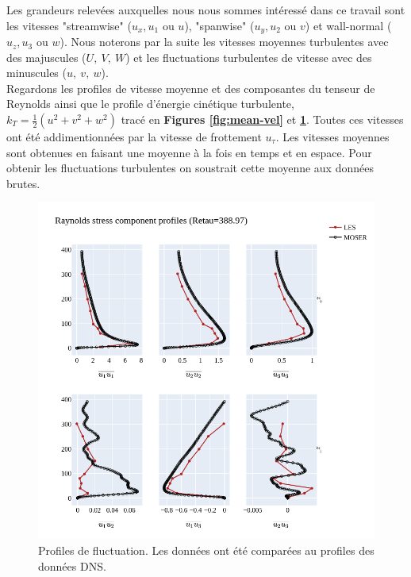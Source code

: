 \documentclass[12pt]{article}
\theoremstyle{plain}
\theoremstyle{remark}
\begin{document}
Les grandeurs relevées auxquelles nous nous sommes intéressé dans ce travail sont les vitesses "streamwise" ($u_x, u_1 \text{ ou } u$), "spanwise" ($u_y, u_2 \text{ ou } v$) et wall-normal ($u_z, u_3 \text{ ou } w$). Nous noterons par la suite les vitesses moyennes turbulentes avec des majuscules ($U,~V,~W$) et les fluctuations turbulentes de vitesse avec des minuscules ($u,~v,~w$).\\

Regardons les profiles de vitesse moyenne et des composantes du tenseur de Reynolds ainsi que le profile d'énergie cinétique turbulente, $k_T=\frac{1}{2}(u^2+v^2+w^2)$ tracé en {\bf Figures \ref{fig:mean-vel}} et {\bf  \ref{fig:fluct-vel}}. Toutes ces vitesses ont été addimentionnées par la vitesse de frottement $u_{\tau}$. Les vitesses moyennes sont obtenues en faisant une moyenne à la fois en temps et en espace. Pour obtenir les fluctuations turbulentes on soustrait cette moyenne aux données brutes.\\

\begin{figure}[H]
	\begin{center}
		\includegraphics[width=0.8\linewidth]{../../output/figures/channel_wrles_retau395/split_time/RANS/var_velocity_profiles_all.png}
		\caption{Profiles de fluctuation. Les données ont été comparées au profiles des données DNS.}
		\label{fig:fluct-vel}
	\end{center}
\end{figure}
\end{document}
